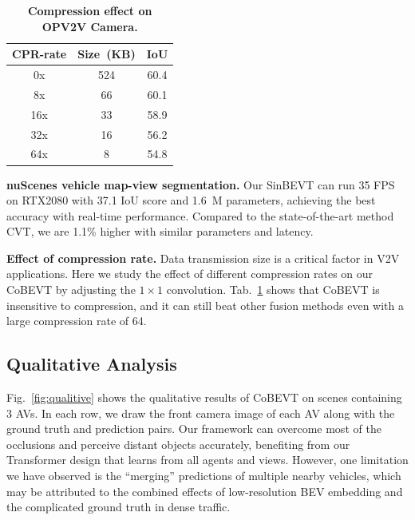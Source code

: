 \documentclass{article}
\begin{document}
{\begin{table}
\vspace{-5mm}
\centering
\footnotesize
\setlength{\tabcolsep}{3pt}
\renewcommand{\arraystretch}{0.8}
\caption{\textbf{Compression effect on OPV2V Camera.}}
\vspace{-1mm}
\label{tab:compression}
\begin{tabular}{ccc}
\cellcolor{lightgray}  {CPR-rate} &
 \cellcolor{lightgray} {Size~(KB)} &
 \cellcolor{lightgray} {IoU}\\ \toprule
 0x & 524  &   60.4\\
 8x & 66  & 60.1 \\
 16x & 33 & 58.9   \\
 32x & 16 & 56.2 \\ 
 64x  & 8 & 54.8 \\  \bottomrule
\end{tabular}
\vspace{-5mm}
\end{table}

\noindent\textbf{nuScenes vehicle map-view segmentation.} Our SinBEVT can run 35 FPS on RTX2080 with 37.1 IoU score and 1.6~M parameters, achieving the best accuracy with real-time performance. Compared to the state-of-the-art method CVT, we are 1.1\% higher with similar parameters and latency.



\noindent\textbf{Effect of compression rate.} Data transmission size is a critical factor in V2V applications.
%
Here we study the effect of different compression rates on our CoBEVT by adjusting the $1\times1$ convolution. Tab.~\ref{tab:compression} shows that CoBEVT is insensitive to compression, and it can still beat other fusion methods even with a large compression rate of 64.




\subsection{Qualitative Analysis}
Fig.~\ref{fig:qualitive} shows the qualitative results of CoBEVT on scenes containing 3 AVs.
%
In each row, we draw the front camera image of each AV along with the ground truth and prediction pairs.
%
Our framework can overcome most of the occlusions and perceive distant objects accurately, benefiting from our Transformer design that learns from all agents and views.
%
However, one limitation we have observed is the ``merging'' predictions of multiple nearby vehicles, which may be attributed to the combined effects of low-resolution BEV embedding and the complicated ground truth in dense traffic.


}
\end{document}
